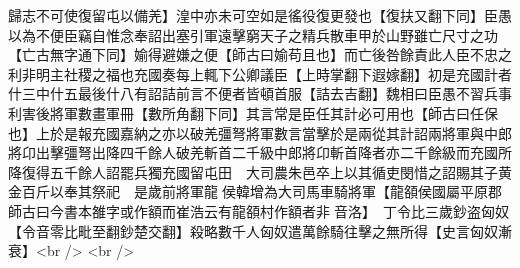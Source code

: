 歸志不可使復留屯以備羌】湟中亦未可空如是徭役復更發也【復扶又翻下同】臣愚以為不便臣竊自惟念奉詔出塞引軍遠擊窮天子之精兵散車甲於山野雖亡尺寸之功【亡古無字通下同】媮得避嫌之便【師古曰媮苟且也】而亡後咎餘責此人臣不忠之利非明主社稷之福也充國奏每上輒下公卿議臣【上時掌翻下遐嫁翻】初是充國計者什三中什五最後什八有詔詰前言不便者皆頓首服【詰去吉翻】魏相曰臣愚不習兵事利害後將軍數畫軍冊【數所角翻下同】其言常是臣任其計必可用也【師古曰任保也】上於是報充國嘉納之亦以破羌彊弩將軍數言當擊於是兩從其計詔兩將軍與中郎將卬出擊彊弩出降四千餘人破羌斬首二千級中郎將卬斬首降者亦二千餘級而充國所降復得五千餘人詔罷兵獨充國留屯田　大司農朱邑卒上以其循吏閔惜之詔賜其子黄金百斤以奉其祭祀　是歲前將軍龍侯韓增為大司馬車騎將軍【龍頟侯國屬平原郡師古曰今書本雒字或作額而崔浩云有龍頟村作額者非音洛】　丁令比三歲鈔盗匈奴【令音零比毗至翻鈔楚交翻】殺略數千人匈奴遣萬餘騎往擊之無所得【史言匈奴漸衰】<br />
<br />
